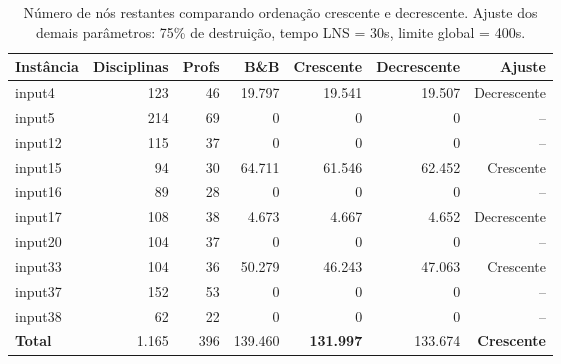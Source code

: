 \begin{table}[htbp]
\centering
\caption{Número de nós restantes comparando ordenação crescente e decrescente. Ajuste dos demais parâmetros: 75\% de destruição, tempo LNS = 30s, limite global = 400s.}
\label{tab:lns_order_nodes}
\small
\begin{tabular}{@{}lrrrrrr@{}}
\toprule
\textbf{Instância} & \textbf{Disciplinas} & \textbf{Profs} & \textbf{B\&B} & \textbf{Crescente} & \textbf{Decrescente} & \textbf{Ajuste} \\
\midrule
input4  & 123 & 46 & 19.797 & 19.541 & 19.507 & Decrescente \\
input5  & 214 & 69 & 0      & 0      & 0      & -- \\
input12 & 115 & 37 & 0      & 0      & 0      & -- \\
input15 & 94  & 30 & 64.711 & 61.546 & 62.452 & Crescente \\
input16 & 89  & 28 & 0      & 0      & 0      & -- \\
input17 & 108 & 38 & 4.673  & 4.667  & 4.652  & Decrescente \\
input20 & 104 & 37 & 0      & 0      & 0      & -- \\
input33 & 104 & 36 & 50.279 & 46.243 & 47.063 & Crescente \\
input37 & 152 & 53 & 0      & 0      & 0      & -- \\
input38 & 62  & 22 & 0      & 0      & 0      & -- \\
\midrule
\textbf{Total}  & 1.165 & 396 & 139.460 & \textbf{131.997} & 133.674 & \textbf{Crescente} \\
\bottomrule
\end{tabular}
\end{table}
